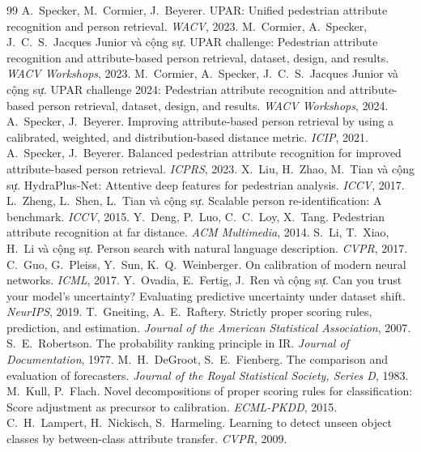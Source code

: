 \documentclass[11pt,a4paper]{article}
\begin{document}
\begin{thebibliography}{99}\small
{} A.~Specker, M.~Cormier, J.~Beyerer. UPAR: Unified pedestrian attribute recognition and person retrieval. \textit{WACV}, 2023.
 M.~Cormier, A.~Specker, J.~C.~S.~Jacques Junior và cộng sự. UPAR challenge: Pedestrian attribute recognition and attribute-based person retrieval, dataset, design, and results. \textit{WACV Workshops}, 2023.
 M.~Cormier, A.~Specker, J.~C.~S.~Jacques Junior và cộng sự. UPAR challenge 2024: Pedestrian attribute recognition and attribute-based person retrieval, dataset, design, and results. \textit{WACV Workshops}, 2024.
 A.~Specker, J.~Beyerer. Improving attribute-based person retrieval by using a calibrated, weighted, and distribution-based distance metric. \textit{ICIP}, 2021.
 A.~Specker, J.~Beyerer. Balanced pedestrian attribute recognition for improved attribute-based person retrieval. \textit{ICPRS}, 2023.
 X.~Liu, H.~Zhao, M.~Tian và cộng sự. HydraPlus-Net: Attentive deep features for pedestrian analysis. \textit{ICCV}, 2017.
 L.~Zheng, L.~Shen, L.~Tian và cộng sự. Scalable person re-identification: A benchmark. \textit{ICCV}, 2015.
 Y.~Deng, P.~Luo, C.~C.~Loy, X.~Tang. Pedestrian attribute recognition at far distance. \textit{ACM Multimedia}, 2014.
 S.~Li, T.~Xiao, H.~Li và cộng sự. Person search with natural language description. \textit{CVPR}, 2017.
 C.~Guo, G.~Pleiss, Y.~Sun, K.~Q.~Weinberger. On calibration of modern neural networks. \textit{ICML}, 2017.
 Y.~Ovadia, E.~Fertig, J.~Ren và cộng sự. Can you trust your model's uncertainty? Evaluating predictive uncertainty under dataset shift. \textit{NeurIPS}, 2019.
 T.~Gneiting, A.~E.~Raftery. Strictly proper scoring rules, prediction, and estimation. \textit{Journal of the American Statistical Association}, 2007.
 S.~E.~Robertson. The probability ranking principle in IR. \textit{Journal of Documentation}, 1977.
 M.~H.~DeGroot, S.~E.~Fienberg. The comparison and evaluation of forecasters. \textit{Journal of the Royal Statistical Society, Series D}, 1983.
 M.~Kull, P.~Flach. Novel decompositions of proper scoring rules for classification: Score adjustment as precursor to calibration. \textit{ECML-PKDD}, 2015.
 C.~H.~Lampert, H.~Nickisch, S.~Harmeling. Learning to detect unseen object classes by between-class attribute transfer. \textit{CVPR}, 2009.

\end{thebibliography}
\end{document}

